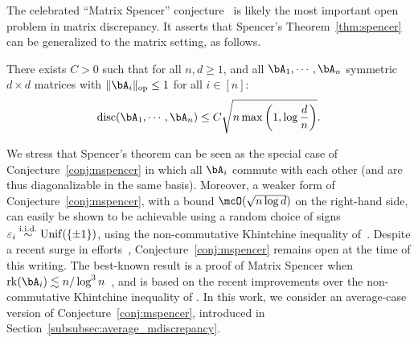\myskip
The celebrated ``Matrix Spencer'' conjecture~\citep{zouzias2012matrix,meka2014discrepancy1} is likely the most important open problem in matrix discrepancy.
It asserts that Spencer's Theorem~\ref{thm:spencer} can be generalized to the matrix setting, as follows.
\begin{conjecture}\label{conj:mspencer}
    There exists $C > 0$ such that for all $n, d \geq 1$, and all $\bA_1, \cdots, \bA_n$ symmetric $d \times d$ matrices with $\|\bA_i\|_\op \leq 1$ for all $i \in [n]$:
    \begin{equation*}
        \disc(\bA_1, \cdots, \bA_n) \leq C \sqrt{n \max\left(1, \log \frac{d}{n}\right)}.
    \end{equation*}
\end{conjecture}
\noindent
We stress that Spencer's theorem can be seen as the special case of Conjecture~\ref{conj:mspencer} in which all $\bA_i$ commute with each other (and are thus diagonalizable in the same basis).
Moreover, a weaker form of Conjecture~\ref{conj:mspencer}, with a bound $\mcO(\sqrt{n \log d})$ on the right-hand side, can easily be shown to be achievable using a random choice 
of signs $\varepsilon_i \overset{\mathrm{i.i.d.}}{\sim} \mathrm{Unif}(\{\pm 1\})$, using the non-commutative Khintchine inequality of~\cite{lust1991non}.
Despite a recent surge in efforts~, Conjecture~\ref{conj:mspencer} remains open at the time of this writing. 
The best-known result is a proof of Matrix Spencer when
$\rk(\bA_i) \lesssim n / \log^3 n$~\citep{bansal2023resolving}, and is based on the recent improvements over the non-commutative Khintchine inequality of \cite{bandeira2023matrix}.
In this work, we consider an average-case version of Conjecture~\ref{conj:mspencer}, introduced in Section~\ref{subsubsec:average_mdiscrepancy}.

\subsubsection{}\label{subsubsec:sbp}

